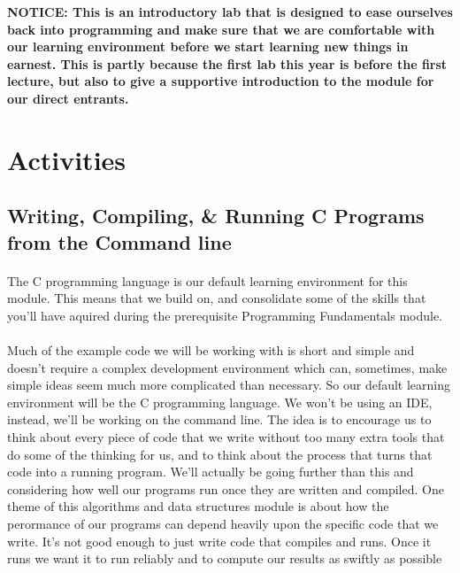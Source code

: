 \documentclass[10pt, a4paper, twosize]{article}
\begin{document}
\begin{framed}
{\bf{NOTICE:} This is an introductory lab that is designed to ease ourselves back into programming and make sure that we are comfortable with our learning environment before we start learning new things in earnest. This is partly because the first lab this year is before the first lecture, but also to give a supportive introduction to the module for our direct entrants.}  
\end{framed}


\section{Activities}

\subsection{Writing, Compiling, \& Running C Programs from the Command line}

\paragraph{} The C programming language is our default learning environment for this module. This means that we build on, and consolidate some of the skills that you'll have aquired during the prerequisite Programming Fundamentals module.

\paragraph{} Much of the example code we will be working with is short and simple and doesn't require a complex development environment which can, sometimes, make simple ideas seem much more complicated than necessary. So our default learning environment will be the C programming language. We won't be using an IDE, instead, we'll be working on the command line. The idea is to encourage us to think about every piece of code that we write without too many extra tools that do some of the thinking for us, and to think about the process that turns that code into a running program. We'll actually be going further than this and considering how well our programs run once they are written and compiled. One theme of this algorithms and data structures module is about how the perormance of our programs can depend heavily upon the specific code that we write. It's not good enough to just write code that compiles and runs. Once it runs we want it to run reliably and to compute our results as swiftly as possible
\end{document}
